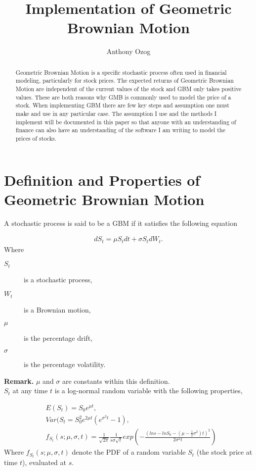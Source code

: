 \documentclass{article}
\title{Implementation of Geometric Brownian Motion}
\author{Anthony Ozog}
\begin{document}
\maketitle

\begin{abstract}
Geometric Brownian Motion is a specific stochastic process often used in financial modeling, particularly for stock prices. The expected returns of Geometric Brownian Motion are independent of the current values of the stock and GBM only takes positive values. These are both reasons why GMB is commonly used to model the price of a stock. When implementing GBM there are few key steps and assumption one must make and use in any particular case. The assumption I use and the methods I implement will be documented in this paper so that anyone with an understanding of finance can also have an understanding of the software I am writing to model the prices of stocks.
\end{abstract}

\section{Definition and Properties of Geometric Brownian Motion}
A stochastic process is said to be a GBM if it satisfies the following equation

\begin{align}
	dS_t = \mu S_t dt + \sigma S_tdW_t.
\end{align}
Where

\begin{description}
	\item[$S_t$] is a stochastic process,
	\item[$W_t$] is a Brownian motion,
	\item[$\mu$] is the percentage drift,
	\item[$\sigma$] is the percentage volatility.
\end{description}
\noindent
{\bf Remark.} $\mu$ and $\sigma$ are constants within this definition.\\

\noindent
$S_t$ at any time $t$ is a log-normal random variable with the following properties, 

\begin{align}
	&E(S_t) = S_0e^{\mu t},\\
	&Var(S_t = S_0^2e^{2\mu t}\left (e^{\sigma^2 t} - 1 \right),\\
	&f_{S_t}(s; \mu, \sigma, t) = \frac{1}{\sqrt{2\pi}} \frac{1}{s\sigma \sqrt t}exp\left( -\frac{(lns-ln S_0 - (\mu  - \frac{1}{2} \sigma^2 )t)^2}{2\sigma^2 t} \right)
\end{align}
\noindent
Where $f_{S_t}(s; \mu, \sigma, t)$ denote the PDF of a random variable $S_t$ (the stock price at time $t$), evaluated at $s$.
\end{document}
